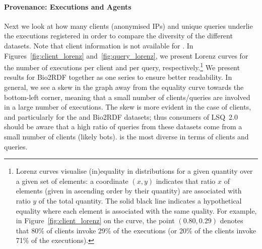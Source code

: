 \paragraph{Provenance: Executions and Agents} Next we look at how many clients (anonymised IPs) and unique queries underlie the executions registered in order to compare the diversity of the different datasets. Note that client information is not available for \wikidata. In Figures~\ref{fig:client_lorenz} and~\ref{fig:query_lorenz}, we present Lorenz curves for the number of executions per client and per query, respectively.\footnote{Lorenz curves visualise (in)equality in distributions for a given quantity over a given set of elements: a coordinate $(x,y)$ indicates that ratio $x$ of elements (given in ascending order by their quantity) are associated with ratio $y$ of the total quantity. The solid black line indicates a hypothetical equality where each element is associated with the same quality. For example, in Figure~\ref{fig:client_lorenz} on the \dbpedia curve, the point $(0.80,0.29)$ denotes that 80\% of clients invoke 29\% of the executions (or 20\% of the clients invoke 71\% of the executions).} We present results for Bio2RDF together as one series to ensure better readability. In general, we see a skew in the graph away from the equality curve towards the bottom-left corner, meaning that a small number of clients/queries are involved in a large number of executions. The skew is more evident in the case of clients, and particularly for the \swdf and Bio2RDF datasets; thus consumers of LSQ~2.0 should be aware that a high ratio of queries from these datasets come from a small number of clients (likely bots). \dbpedia is the most diverse in terms of clients and queries.

